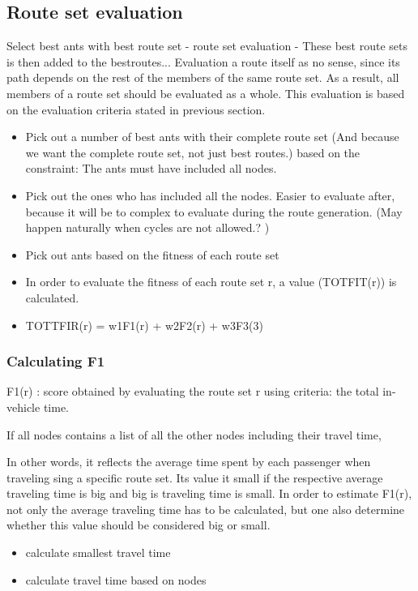 \subsection{Route set evaluation}
Select best ants with best route set - route set evaluation - These best route sets is then added to the bestroutes...
Evaluation a route itself as no sense, since its path depends on the rest of the members of the same route set. As a result, all members of a route set should be evaluated as a whole. This evaluation is based on the evaluation criteria stated in previous section.
\begin{itemize}
\item Pick out a number of best ants with their complete route set (And because we want the complete route set, not just best routes.) based on the constraint: The ants must have included all nodes. 
\item Pick out the ones who has included all the nodes. Easier to evaluate after, because it will be to complex to evaluate during the route generation. (May happen naturally when cycles are not allowed.? )
\item Pick out ants based on the fitness of each route set
\item In order to evaluate the fitness of each route set r, a value (TOTFIT(r)) is calculated. 
\item TOTTFIR(r) = w1F1(r) + w2F2(r) + w3F3(3) \citep{kechagiopoulos14}
\end{itemize}

\subsubsection{Calculating F1}
F1(r) : score obtained by evaluating the route set r using criteria: the total in-vehicle time. 

If all nodes contains a list of all the other nodes including their travel time, 

In other words, it reflects the average time spent by each passenger when traveling sing a specific route set. Its value it small if the respective average traveling time is big and big is traveling time is small. In order to estimate F1(r), not only the average traveling time has to be calculated, but one also determine whether this value should be considered big or small. 
\begin{itemize}
\item calculate smallest travel time
\item calculate travel time based on nodes
\end{itemize}

